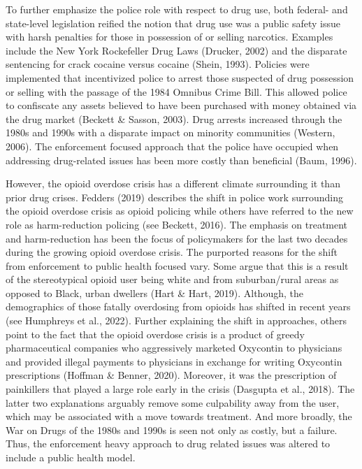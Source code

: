 To further emphasize the police role with respect to drug use, both federal- and state-level legislation reified the notion that drug use was a public safety issue with harsh penalties for those in possession of or selling narcotics. Examples include the New York Rockefeller Drug Laws (Drucker, 2002) and the disparate sentencing for crack cocaine versus cocaine (Shein, 1993). Policies were implemented that incentivized police to arrest those suspected of drug possession or selling with the passage of the 1984 Omnibus Crime Bill. This allowed police to confiscate any assets believed to have been purchased with money obtained via the drug market (Beckett & Sasson, 2003). Drug arrests increased through the 1980s and 1990s with a disparate impact on minority communities (Western, 2006). The enforcement focused approach that the police have occupied when addressing drug-related issues has been more costly than beneficial (Baum, 1996). 

However, the opioid overdose crisis has a different climate surrounding it than prior drug crises. Fedders (2019) describes the shift in police work surrounding the opioid overdose crisis as opioid policing while others have referred to the new role as harm-reduction policing (see Beckett, 2016). The emphasis on treatment and harm-reduction has been the focus of policymakers for the last two decades during the growing opioid overdose crisis. The purported reasons for the shift from enforcement to public health focused vary. Some argue that this is a result of the stereotypical opioid user being white and from suburban/rural areas as opposed to Black, urban dwellers (Hart & Hart, 2019). Although, the demographics of those fatally overdosing from opioids has shifted in recent years (see Humphreys et al., 2022). Further explaining the shift in approaches, others point to the fact that the opioid overdose crisis is a product of greedy pharmaceutical companies who aggressively marketed Oxycontin to physicians and provided illegal payments to physicians in exchange for writing Oxycontin prescriptions (Hoffman & Benner, 2020). Moreover, it was the prescription of painkillers that played a large role early in the crisis (Dasgupta et al., 2018). The latter two explanations arguably remove some culpability away from the user, which may be associated with a move towards treatment. And more broadly, the War on Drugs of the 1980s and 1990s is seen not only as costly, but a failure. Thus, the enforcement heavy approach to drug related issues was altered to include a public health model. 

